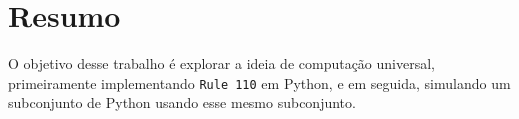 \section*{Resumo}

O objetivo desse trabalho é explorar a ideia de computação
universal,
primeiramente implementando \texttt{Rule 110} em Python,
e em seguida, simulando um subconjunto de Python
usando esse mesmo subconjunto.